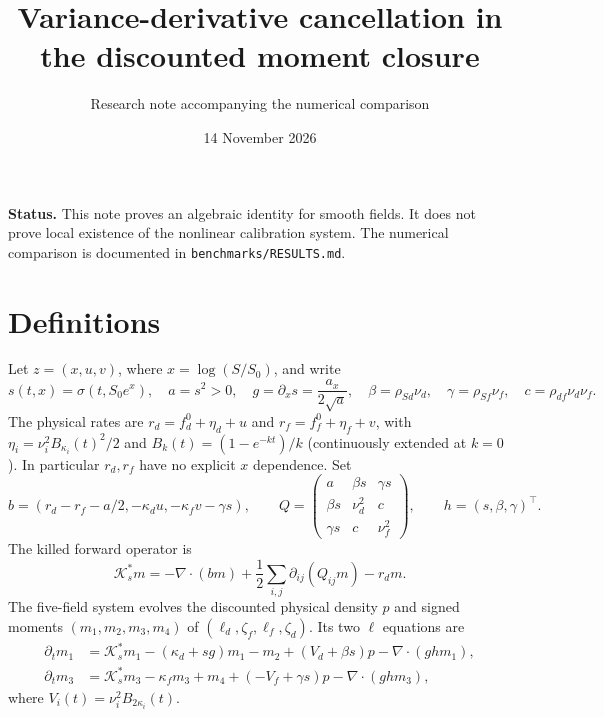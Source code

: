 \documentclass[11pt]{article}
\title{Variance-derivative cancellation in the discounted moment closure}
\author{Research note accompanying the numerical comparison}
\date{14 November 2026}
\begin{document}
\maketitle
\noindent\textbf{Status.} This note proves an algebraic identity for smooth
fields. It does not prove local existence of the nonlinear calibration system.
The numerical comparison is documented in \texttt{benchmarks/RESULTS.md}.

\section{Definitions}
Let $z=(x,u,v)$, where $x=\log(S/S_0)$, and write
\[
 s(t,x)=\sigma(t,S_0e^x),\quad a=s^2>0,\quad
 g=\partial_x s=\frac{a_x}{2\sqrt a},\quad
 \beta=\rho_{Sd}\nu_d,\quad\gamma=\rho_{Sf}\nu_f,
 \quad c=\rho_{df}\nu_d\nu_f.
\]
The physical rates are $r_d=f_d^0+\eta_d+u$ and
$r_f=f_f^0+\eta_f+v$, with
$\eta_i=\nu_i^2 B_{\kappa_i}(t)^2/2$ and
$B_k(t)=(1-e^{-kt})/k$ (continuously extended at $k=0$).
In particular $r_d,r_f$ have no explicit $x$ dependence.
Set
\[
 b=(r_d-r_f-a/2,-\kappa_d u,-\kappa_f v-\gamma s),\qquad
 Q=\begin{pmatrix}a&\beta s&\gamma s\\
 \beta s&\nu_d^2&c\\\gamma s&c&\nu_f^2\end{pmatrix},
 \qquad h=(s,\beta,\gamma)^\top.
\]
The killed forward operator is
\[
 \mathcal K_s^*m=-\nabla\cdot(bm)
       +\frac12\sum_{i,j}\partial_{ij}(Q_{ij}m)-r_dm.
\]
The five-field system evolves the discounted physical density $p$ and signed
moments $(m_1,m_2,m_3,m_4)$ of
$(\ell_d,\zeta_f,\ell_f,\zeta_d)$. Its two $\ell$ equations are
\begin{align}
 \partial_t m_1&=\mathcal K_s^*m_1-(\kappa_d+sg)m_1-m_2
 +(V_d+\beta s)p-\nabla\cdot(ghm_1),\\
 \partial_t m_3&=\mathcal K_s^*m_3-\kappa_fm_3+m_4
 +(-V_f+\gamma s)p-\nabla\cdot(ghm_3),
\end{align}
where $V_i(t)=\nu_i^2 B_{2\kappa_i}(t)$.
\end{document}
